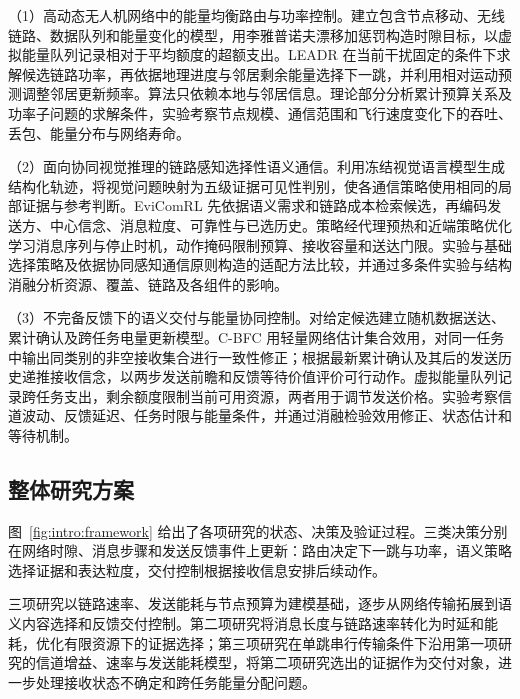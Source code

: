 （1）高动态无人机网络中的能量均衡路由与功率控制。建立包含节点移动、无线链路、数据队列和能量变化的模型，用李雅普诺夫漂移加惩罚构造时隙目标，以虚拟能量队列记录相对于平均额度的超额支出。LEADR 在当前干扰固定的条件下求解候选链路功率，再依据地理进度与邻居剩余能量选择下一跳，并利用相对运动预测调整邻居更新频率。算法只依赖本地与邻居信息。理论部分分析累计预算关系及功率子问题的求解条件，实验考察节点规模、通信范围和飞行速度变化下的吞吐、丢包、能量分布与网络寿命。

（2）面向协同视觉推理的链路感知选择性语义通信。利用冻结视觉语言模型生成结构化轨迹，将视觉问题映射为五级证据可见性判别，使各通信策略使用相同的局部证据与参考判断。EviComRL 先依据语义需求和链路成本检索候选，再编码发送方、中心信念、消息粒度、可靠性与已选历史。策略经代理预热和近端策略优化学习消息序列与停止时机，动作掩码限制预算、接收容量和送达门限。实验与基础选择策略及依据协同感知通信原则构造的适配方法比较，并通过多条件实验与结构消融分析资源、覆盖、链路及各组件的影响。

（3）不完备反馈下的语义交付与能量协同控制。对给定候选建立随机数据送达、累计确认及跨任务电量更新模型。C-BFC 用轻量网络估计集合效用，对同一任务中输出同类别的非空接收集合进行一致性修正；根据最新累计确认及其后的发送历史递推接收信念，以两步发送前瞻和反馈等待价值评价可行动作。虚拟能量队列记录跨任务支出，剩余额度限制当前可用资源，两者用于调节发送价格。实验考察信道波动、反馈延迟、任务时限与能量条件，并通过消融检验效用修正、状态估计和等待机制。

\begin{figure}[htbp]
\centering

\label{fig:intro:chain}
\end{figure}

\subsection{整体研究方案}

图~\ref{fig:intro:framework} 给出了各项研究的状态、决策及验证过程。三类决策分别在网络时隙、消息步骤和发送反馈事件上更新：路由决定下一跳与功率，语义策略选择证据和表达粒度，交付控制根据接收信息安排后续动作。

三项研究以链路速率、发送能耗与节点预算为建模基础，逐步从网络传输拓展到语义内容选择和反馈交付控制。第二项研究将消息长度与链路速率转化为时延和能耗，优化有限资源下的证据选择；第三项研究在单跳串行传输条件下沿用第一项研究的信道增益、速率与发送能耗模型，将第二项研究选出的证据作为交付对象，进一步处理接收状态不确定和跨任务能量分配问题。

